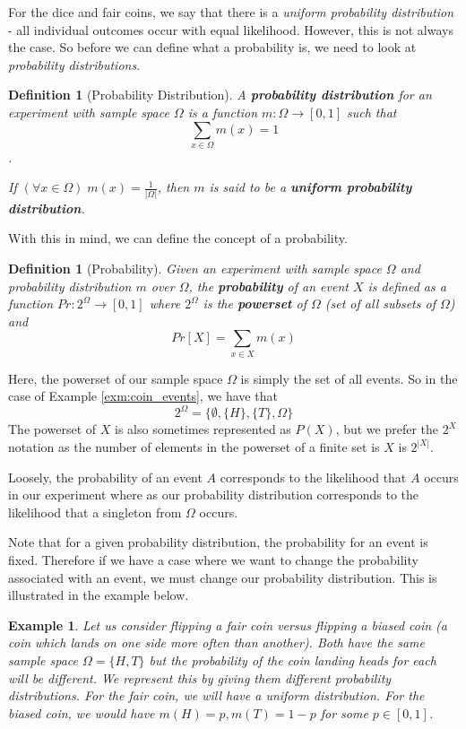 \documentclass[12pt,a4paper]{article}
\newtheorem{definition}[theorem]{Definition}
\newtheorem{example}[theorem]{Example}
\begin{document}
For the dice and fair coins, we say that there is a \textit{uniform probability
distribution} - all individual outcomes occur with equal likelihood. However,
this is not always the case. So before we can define what a probability is, we
need to look at \textit{probability distributions}.

\begin{definition}[Probability Distribution]
A \textbf{probability distribution} for an experiment with sample space $\Omega$ is a
function $m:\Omega \rightarrow [0,1]$ such that
\[\sum_{x \in \Omega} m(x) = 1 \].

If $(\forall x \in \Omega)\; m(x) = \frac{1}{|\Omega|}$, then $m$ is said to be a
\textbf{uniform probability distribution}.
\end{definition}

With this in mind, we can define the concept of a probability.

\begin{definition}[Probability]
Given an experiment with sample space $\Omega$ and probability distribution $m$
over $\Omega$, the \textbf{probability} of an event $X$ is defined as a
function $Pr: 2^\Omega \rightarrow [0,1]$ where $2^\Omega$ is the \textbf{powerset}
of $\Omega$ (set of all subsets of $\Omega$) and
\[Pr[X] = \sum_{x \in X} m(x) \]
\end{definition}
Here, the powerset of our sample space $\Omega$ is simply the set of all
events. So in the case of Example \ref{exm:coin_events}, we have that
\[2^\Omega = \{\emptyset,\{H\},\{T\},\Omega\}\] The powerset of $X$ is also
sometimes represented as $P(X)$, but we prefer the $2^X$ notation as the number
of elements in the powerset of a finite set is $X$ is $2^|X|$. 

Loosely, the probability of an event $A$ corresponds to the likelihood
that $A$ occurs in our experiment where as our probability distribution
corresponds to the likelihood that a singleton from $\Omega$ occurs. 

Note that for a given probability distribution, the probability for an event is
fixed. Therefore if we have a case where we want to change the probability
associated with an event, we must change our probability distribution. This is
illustrated in the example below.

\begin{example} Let us consider flipping a fair coin versus flipping a biased
coin (a coin which lands on one side more often than another). Both have the
same sample space $\Omega=\{H,T\}$ but the probability of the coin landing
heads for each will be different. We represent this by giving them different
probability distributions. For the fair coin, we will have a uniform
distribution. For the biased coin, we would have $m(H) = p, m(T) = 1-p$ for
some $p \in [0,1]$.  \end{example}
\end{document}
